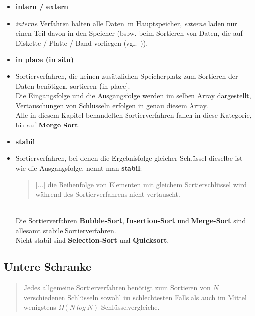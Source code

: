 \begin{itemize}
    \item \textbf{intern / extern}
    \item[] \textit{interne} Verfahren halten alle Daten im Hauptspeicher, \textit{externe} laden nur einen Teil davon in den Speicher (bspw. beim Sortieren von Daten, die auf Diskette / Platte / Band vorliegen (vgl.~\cite[80]{OW17b})).
    \item \textbf{in place (in situ)}
    \item [] Sortierverfahren, die keinen zusätzlichen Speicherplatz zum Sortieren der Daten benötigen, sortieren \textbf(in place).\\
    Die Eingangsfolge und die Ausgangsfolge werden im selben Array dargestellt, Vertauschungen von Schlüsseln erfolgen in genau diesem Array.\\
    Alle in diesem Kapitel behandelten Sortierverfahren fallen in diese Kategorie, bis auf \textbf{Merge-Sort}.
    \item \textbf{stabil}
    \item[] Sortierverfahren, bei denen die Ergebnisfolge gleicher Schlüssel dieselbe ist wie die Ausgangsfolge, nennt man \textbf{stabil}:\blockquote[{\cite[164]{OW17b}}]{
        [...] die Reihenfolge von Elementen mit gleichem Sortierschlüssel wird während des Sortierverfahrens nicht vertauscht.
    }.\\
    Die Sortierverfahren \textbf{Bubble-Sort}, \textbf{Insertion-Sort} und \textbf{Merge-Sort} sind allesamt stabile Sortierverfahren.\\
    Nicht stabil sind \textbf{Selection-Sort} und \textbf{Quicksort}.
\end{itemize}


\subsection{Untere Schranke}

\blockquote[{\cite[154, Satz2.4]{OW17b}}]{
    Jedes allgemeine Sortierverfahren benötigt zum Sortieren von $N$ verschiedenen Schlüsseln sowohl im schlechtesten Falls als auch im Mittel wenigstens $\Omega(N\ log\ N)$ Schlüsselvergleiche.
}.